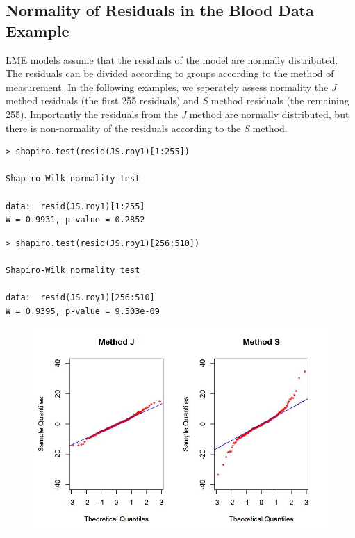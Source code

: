 \documentclass[Main.tex]{subfiles}
\begin{document}
\subsection{Normality of Residuals in the Blood Data Example}
LME models assume that the residuals of the model are normally distributed.  The residuals can be divided according to groups according to the method of measurement. In the following examples, we seperately assess normality the \textit{J} method residuals (the first 255 residuals) and \textit{S} method residuals (the remaining 255). Importantly the residuals from the \textit{J} method are normally distributed, but there is non-normality of the residuals according to the \textit{S} method.
\begin{framed}
\begin{verbatim}
> shapiro.test(resid(JS.roy1)[1:255])

Shapiro-Wilk normality test

data:  resid(JS.roy1)[1:255]
W = 0.9931, p-value = 0.2852
\end{verbatim}
\end{framed}

\begin{framed}
	\begin{verbatim}
> shapiro.test(resid(JS.roy1)[256:510])

Shapiro-Wilk normality test

data:  resid(JS.roy1)[256:510]
W = 0.9395, p-value = 9.503e-09
\end{verbatim}
\end{framed}
\begin{figure}[h!]
\centering
\includegraphics[width=0.9\linewidth]{images/Resid-newplot2}
\caption{}
\label{fig:Resid-newplot2}
\end{figure}
\end{document}
